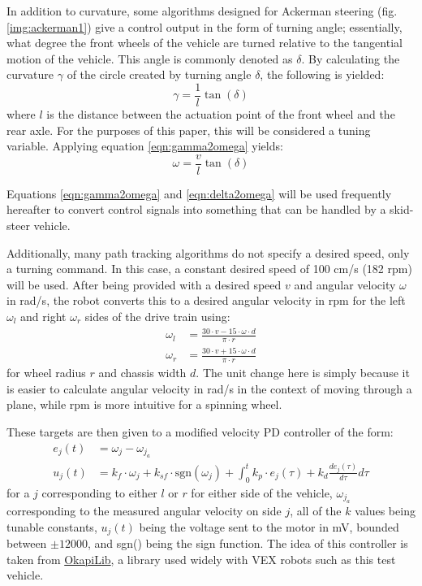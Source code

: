 \documentclass[mla7]{mla}
\begin{document}
\begin{paper}
In addition to curvature, some algorithms designed for Ackerman steering (fig. \ref{img:ackerman1}) give a control output in the form of turning angle; essentially, what degree the front wheels of the vehicle are turned relative to the tangential motion of the vehicle. This angle is commonly denoted as $\delta$. By calculating the curvature $\gamma$ of the circle created by turning angle $\delta$, the following is yielded:
\begin{equation}
\gamma = \frac{1}{l}\tan{(\delta)}
\end{equation}
where $l$ is the distance between the actuation point of the front wheel and the rear axle. For the purposes of this paper, this will be considered a tuning variable. Applying equation \ref{eqn:gamma2omega} yields:
\begin{equation}
\omega = \frac{v}{l}\tan{(\delta)} \label{eqn:delta2omega}
\end{equation}

Equations \ref{eqn:gamma2omega} and \ref{eqn:delta2omega} will be used frequently hereafter to convert control signals into something that can be handled by a skid-steer vehicle. 

Additionally, many path tracking algorithms do not specify a desired speed, only a turning command. In this case, a constant desired speed of 100 cm/s (182 rpm) will be used. After being provided with a desired speed $v$ and angular velocity $\omega$ in rad/s, the robot converts this to a desired angular velocity in rpm for the left $\omega_l$ and right $\omega_r$ sides of the drive train using:
\begin{subequations}
\begin{align}
\omega_l&= \frac{30 \cdot v - 15 \cdot \omega \cdot d}{\pi \cdot r} \\
\omega_r&= \frac{30 \cdot v + 15 \cdot \omega \cdot d}{\pi \cdot r}
\end{align}
\end{subequations}
for wheel radius $r$ and chassis width $d$. The unit change here is simply because it is easier to calculate angular velocity in rad/s in the context of moving through a plane, while rpm is more intuitive for a spinning wheel.

These targets are then given to a modified velocity PD controller of the form:
\begin{subequations}
\begin{align}
e_j(t) &= \omega_j - \omega_{j_a} \\
u_j(t) &= k_f \cdot \omega_j + k_{sf} \cdot \text{sgn}(\omega_j) + \int_0^t \! k_p \cdot e_j(\tau) + k_d \frac{de_j(\tau)}{d\tau} d\tau
\end{align}
\end{subequations}
for a $j$ corresponding to either $l$ or $r$ for either side of the vehicle, $\omega_{j_a}$ corresponding to the measured angular velocity on side $j$, all of the $k$ values being tunable constants, $u_j(t)$ being the voltage sent to the motor in mV, bounded between $\pm12000$, and sgn() being the sign function. The idea of this controller is taken from \href{https://github.com/OkapiLib/OkapiLib}{OkapiLib}, a library used widely with VEX robots such as this test vehicle. 


\end{paper}
\end{document}
